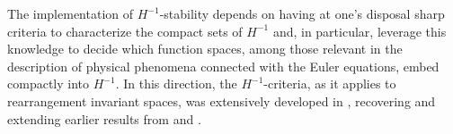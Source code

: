 \documentclass[11pt, a4paper,leqno]{amsart}
\theoremstyle{plain}
\numberwithin{equation}{section}
\theoremstyle{definition}
\theoremstyle{remark}
\def\R{\mathbb{R}}
\begin{document}


The implementation of $H^{-1}$-stability depends on having at one's
disposal sharp criteria to characterize the compact sets of $H^{-1}$ and, in
particular, leverage this knowledge to decide which function spaces, among
those relevant in the description of physical phenomena connected with the
Euler equations, embed compactly into $H^{-1}.$ In this direction, the
$H^{-1}$-criteria, as it applies to rearrangement invariant spaces, was
extensively developed in \cite{LNT}, recovering and extending earlier results from \cite{DiPernaMajda} and  \cite{Lio96}. 









%
\end{document}
